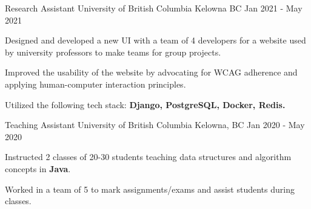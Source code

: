 \begin{cventries}


	\cventry
	{Research Assistant} %
	{University of British Columbia} %
	{Kelowna BC} %
	{Jan 2021 - May 2021} %
	{
		\begin{cvitems} %
			\item {Designed and developed a new UI with a team of 4 developers for a website used by university professors to make teams for group projects.}
			\item {Improved the usability of the website by advocating for WCAG adherence and applying human-computer interaction principles.}
			\item {Utilized the following tech stack:  \textbf{Django, PostgreSQL, Docker, Redis.}}
		\end{cvitems}
	}


	\cventry
	{Teaching Assistant} %
	{University of British Columbia} %
	{Kelowna, BC} %
	{Jan 2020 - May 2020} %
	{
		\begin{cvitems} %
			\item {Instructed 2 classes of 20-30 students teaching data structures and algorithm concepts in \textbf{Java}.}
			\item {Worked in a team of 5 to mark assignments/exams and assist students during classes.}
		\end{cvitems}
	}


\end{cventries}
